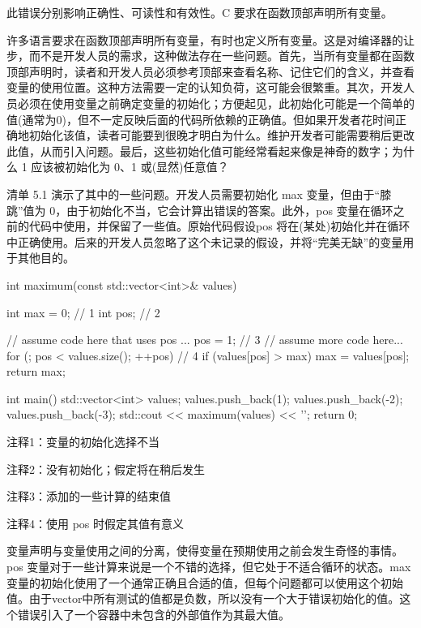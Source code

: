 此错误分别影响正确性、可读性和有效性。C 要求在函数顶部声明所有变量。


许多语言要求在函数顶部声明所有变量，有时也定义所有变量。这是对编译器的让步，而不是开发人员的需求，这种做法存在一些问题。首先，当所有变量都在函数顶部声明时，读者和开发人员必须参考顶部来查看名称、记住它们的含义，并查看变量的使用位置。这种方法需要一定的认知负荷，这可能会很繁重。其次，开发人员必须在使用变量之前确定变量的初始化；方便起见，此初始化可能是一个简单的值(通常为0)，但不一定反映后面的代码所依赖的正确值。但如果开发者花时间正确地初始化该值，读者可能要到很晚才明白为什么。维护开发者可能需要稍后更改此值，从而引入问题。最后，这些初始化值可能经常看起来像是神奇的数字；为什么 1 应该被初始化为 0、1 或(显然)任意值？

清单 5.1 演示了其中的一些问题。开发人员需要初始化 max 变量，但由于“膝跳”值为 0，由于初始化不当，它会计算出错误的答案。此外，pos 变量在循环之前的代码中使用，并保留了一些值。原始代码假设pos 将在(某处)初始化并在循环中正确使用。后来的开发人员忽略了这个未记录的假设，并将“完美无缺”的变量用于其他目的。


\begin{cpp}
int maximum(const std::vector<int>& values) {
  int max = 0; // 1
  int pos; // 2

  // assume code here that uses pos ...
  pos = 1; // 3
  // assume more code here...
  for (; pos < values.size(); ++pos) // 4
    if (values[pos] > max)
      max = values[pos];
  return max;
}

int main() {
  std::vector<int> values;
  values.push_back(1);
  values.push_back(-2);
  values.push_back(-3);
  std::cout << maximum(values) << '\n';
  return 0;
}
\end{cpp}

{\footnotesize
注释1：变量的初始化选择不当

注释2：没有初始化；假定将在稍后发生

注释3：添加的一些计算的结束值

注释4：使用 pos 时假定其值有意义
}


变量声明与变量使用之间的分离，使得变量在预期使用之前会发生奇怪的事情。pos 变量对于一些计算来说是一个不错的选择，但它处于不适合循环的状态。max 变量的初始化使用了一个通常正确且合适的值，但每个问题都可以使用这个初始值。由于vector中所有测试的值都是负数，所以没有一个大于错误初始化的值。这个错误引入了一个容器中未包含的外部值作为其最大值。

